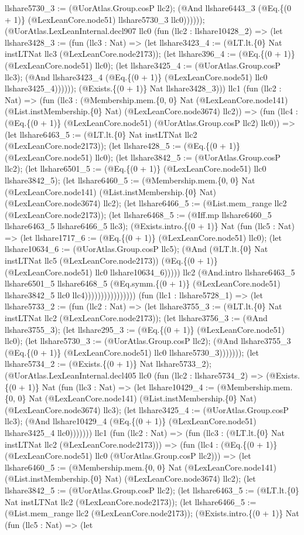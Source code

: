 \documentclass[11pt]{article}
\begin{document}
llshare5730\_3 := (@UorAtlas.Group.cosP llc2); (@And llshare6443\_3 (@Eq.\{(0 + 1)\} (@LexLeanCore.node51) llshare5730\_3 llc0)))))); (@UorAtlas.LexLeanInternal.decl907 llc0 (fun (llc2 : llshare10428\_2) => (let llshare3428\_3 := (fun (llc3 : Nat) => (let llshare3423\_4 := (@LT.lt.\{0\} Nat instLTNat llc3 (@LexLeanCore.node2173)); (let llshare396\_4 := (@Eq.\{(0 + 1)\} (@LexLeanCore.node51) llc0); (let llshare3425\_4 := (@UorAtlas.Group.cosP llc3); (@And llshare3423\_4 (@Eq.\{(0 + 1)\} (@LexLeanCore.node51) llc0 llshare3425\_4)))))); (@Exists.\{(0 + 1)\} Nat llshare3428\_3))) llc1 (fun (llc2 : Nat) => (fun (llc3 : (@Membership.mem.\{0, 0\} Nat (@LexLeanCore.node141) (@List.instMembership.\{0\} Nat) (@LexLeanCore.node3674) llc2)) => (fun (llc4 : (@Eq.\{(0 + 1)\} (@LexLeanCore.node51) (@UorAtlas.Group.cosP llc2) llc0)) => (let llshare6463\_5 := (@LT.lt.\{0\} Nat instLTNat llc2 (@LexLeanCore.node2173)); (let llshare428\_5 := (@Eq.\{(0 + 1)\} (@LexLeanCore.node51) llc0); (let llshare3842\_5 := (@UorAtlas.Group.cosP llc2); (let llshare6501\_5 := (@Eq.\{(0 + 1)\} (@LexLeanCore.node51) llc0 llshare3842\_5); (let llshare6460\_5 := (@Membership.mem.\{0, 0\} Nat (@LexLeanCore.node141) (@List.instMembership.\{0\} Nat) (@LexLeanCore.node3674) llc2); (let llshare6466\_5 := (@List.mem\_range llc2 (@LexLeanCore.node2173)); (let llshare6468\_5 := (@Iff.mp llshare6460\_5 llshare6463\_5 llshare6466\_5 llc3); (@Exists.intro.\{(0 + 1)\} Nat (fun (llc5 : Nat) => (let llshare1717\_6 := (@Eq.\{(0 + 1)\} (@LexLeanCore.node51) llc0); (let llshare10634\_6 := (@UorAtlas.Group.cosP llc5); (@And (@LT.lt.\{0\} Nat instLTNat llc5 (@LexLeanCore.node2173)) (@Eq.\{(0 + 1)\} (@LexLeanCore.node51) llc0 llshare10634\_6))))) llc2 (@And.intro llshare6463\_5 llshare6501\_5 llshare6468\_5 (@Eq.symm.\{(0 + 1)\} (@LexLeanCore.node51) llshare3842\_5 llc0 llc4)))))))))))))))) (fun (llc1 : llshare5728\_1) => (let llshare5733\_2 := (fun (llc2 : Nat) => (let llshare3755\_3 := (@LT.lt.\{0\} Nat instLTNat llc2 (@LexLeanCore.node2173)); (let llshare3756\_3 := (@And llshare3755\_3); (let llshare295\_3 := (@Eq.\{(0 + 1)\} (@LexLeanCore.node51) llc0); (let llshare5730\_3 := (@UorAtlas.Group.cosP llc2); (@And llshare3755\_3 (@Eq.\{(0 + 1)\} (@LexLeanCore.node51) llc0 llshare5730\_3))))))); (let llshare5734\_2 := (@Exists.\{(0 + 1)\} Nat llshare5733\_2); (@UorAtlas.LexLeanInternal.decl405 llc0 (fun (llc2 : llshare5734\_2) => (@Exists.\{(0 + 1)\} Nat (fun (llc3 : Nat) => (let llshare10429\_4 := (@Membership.mem.\{0, 0\} Nat (@LexLeanCore.node141) (@List.instMembership.\{0\} Nat) (@LexLeanCore.node3674) llc3); (let llshare3425\_4 := (@UorAtlas.Group.cosP llc3); (@And llshare10429\_4 (@Eq.\{(0 + 1)\} (@LexLeanCore.node51) llshare3425\_4 llc0))))))) llc1 (fun (llc2 : Nat) => (fun (llc3 : (@LT.lt.\{0\} Nat instLTNat llc2 (@LexLeanCore.node2173))) => (fun (llc4 : (@Eq.\{(0 + 1)\} (@LexLeanCore.node51) llc0 (@UorAtlas.Group.cosP llc2))) => (let llshare6460\_5 := (@Membership.mem.\{0, 0\} Nat (@LexLeanCore.node141) (@List.instMembership.\{0\} Nat) (@LexLeanCore.node3674) llc2); (let llshare3842\_5 := (@UorAtlas.Group.cosP llc2); (let llshare6463\_5 := (@LT.lt.\{0\} Nat instLTNat llc2 (@LexLeanCore.node2173)); (let llshare6466\_5 := (@List.mem\_range llc2 (@LexLeanCore.node2173)); (@Exists.intro.\{(0 + 1)\} Nat (fun (llc5 : Nat) => (let 
\end{document}
